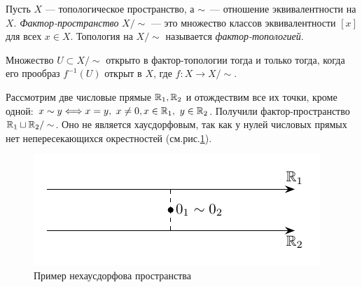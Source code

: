 
\begin{definition}
    Пусть $X$ — топологическое пространство, а $\sim$ — отношение эквивалентности на $X$. \textit{Фактор-пространство} $X / \sim$ — это множество классов эквивалентности $[x]$ для всех $x \in X$. Топология на $X / \sim$ называется \textit{фактор-топологией}.

    Множество $U \subset X / \sim $ открыто в фактор-топологии тогда и только тогда, когда его прообраз $f^{-1}(U)$ открыт в $X$, где $f: X \to X / \sim$.
\end{definition}

\begin{example}
    Рассмотрим две числовые прямые $\mathbb{R}_1, \mathbb{R}_2$ и отождествим все их точки, кроме одной: $x \sim y \Longleftrightarrow x = y, \ x \ne 0, x \in \mathbb{R}_1, \ y \in \mathbb{R}_2$. 
    Получили фактор-пространство $\mathbb{R}_1 \sqcup \mathbb{R}_2 / \sim$.
    Оно не является хаусдорфовым, так как у нулей числовых прямых нет непересекающихся окрестностей (см.рис.\ref{fig:c2.1}).

    \begin{figure}
        \centering
        \includegraphics{images/c2.1.pdf}
        \caption{Пример нехаусдорфова пространства}
        \label{fig:c2.1}
    \end{figure}
\end{example}
